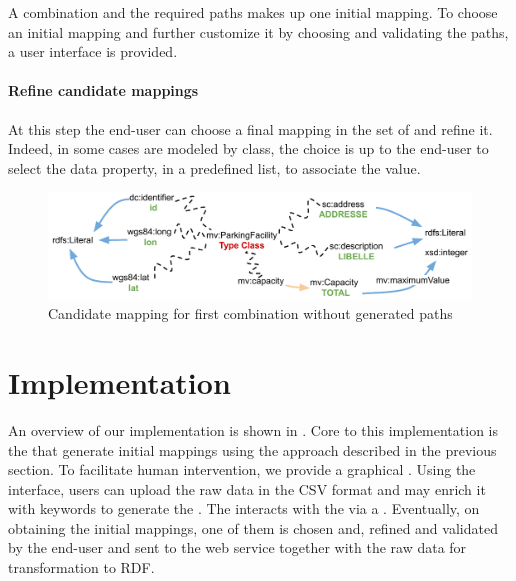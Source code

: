 A combination and the required paths makes up one initial mapping. To choose an initial mapping and further customize it by choosing and validating the paths, a user interface is provided.

\paragraph{Refine candidate mappings}
At this step the end-user can choose a final mapping in the set of  and refine it. Indeed, in some cases  are modeled by class, the choice is up to the end-user to select the data property, in a predefined list, to associate the value.





\begin{figure}
	\centering
	\includegraphics[scale=0.4]{images/combinationNoPath.pdf}
	\caption{Candidate mapping for first combination without generated paths}
	\label{fig:combinationNoPath}
\end{figure}

\section{Implementation}\label{sec:implementation}
An overview of our implementation is shown in . Core to this implementation is the  that generate initial mappings using the approach described in the previous section. To facilitate human intervention,
we provide a graphical . Using the interface, users can upload the raw data in the CSV format and may enrich it with keywords to generate the . The  interacts with the  via a . Eventually, on obtaining the initial mappings, one of them is chosen and, refined and validated by the end-user and sent to the web service together with the raw data for transformation to RDF.

